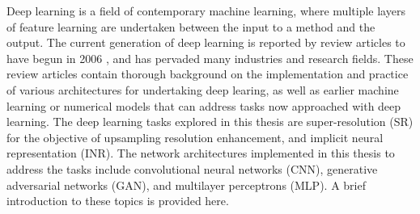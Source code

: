 \documentclass[manuscript.tex]{subfiles}
\begin{document}
Deep learning is a field of contemporary machine learning, where multiple layers of feature learning are undertaken between the input to a method and the output.
The current generation of deep learning is reported by review articles to have begun in 2006 \parencite{dengDeepLearningMethods2014,goodfellowDeepLearning2016a}, and has pervaded many industries and research fields.
These review articles contain thorough background on the implementation and practice of various architectures for undertaking deep learing, as well as earlier machine learning or numerical models that can address tasks now approached with deep learning.
The deep learning tasks explored in this thesis are super-resolution (SR) for the objective of upsampling resolution enhancement, and implicit neural representation (INR).
The network architectures implemented in this thesis to address the tasks include convolutional neural networks (CNN), generative adversarial networks (GAN), and multilayer perceptrons (MLP).
A brief introduction to these topics is provided here.
\end{document}
